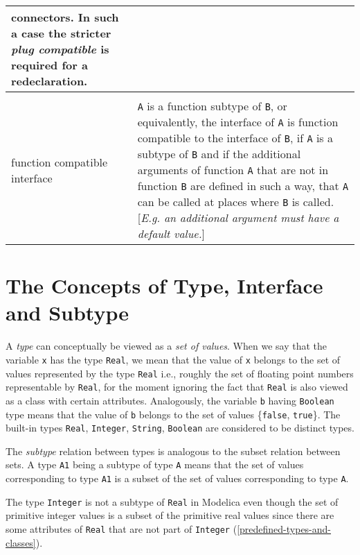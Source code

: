\begin{longtable}{|p{4cm}|p{8cm}|}
connectors. In such a case the stricter \emph{plug compatible} is required
for a redeclaration.\\ \hline
\begin{tabular}{@{}p{4cm}@{}}
function subtype or\\
function compatible interface
\end{tabular} &
\lstinline!A! is a function subtype of \lstinline!B!, or equivalently, the interface of \lstinline!A! is
function compatible to the interface of \lstinline!B!, if \lstinline!A! is a subtype of \lstinline!B! and if
the additional arguments of function \lstinline!A! that are not in function \lstinline!B! are
defined in such a way, that \lstinline!A! can be called at places where \lstinline!B! is called.
{[}\emph{E.g. an additional argument must have a default
value.}{]}\\ \hline
\end{longtable}

\section{The Concepts of Type, Interface and Subtype}

A \emph{type} can conceptually be viewed as a \emph{set of values}. When
we say that the variable \lstinline!x! has the type \lstinline!Real!, we mean that the value of
\lstinline!x! belongs to the set of values represented by the type \lstinline!Real! i.e.,
roughly the set of floating point numbers representable by \lstinline!Real!, for the
moment ignoring the fact that \lstinline!Real! is also viewed as a class with
certain attributes. Analogously, the variable \lstinline!b! having \lstinline!Boolean! type
means that the value of \lstinline!b! belongs to the set of values \{\lstinline!false!, \lstinline!true!\}.
The built-in types \lstinline!Real!, \lstinline!Integer!, \lstinline!String!,
\lstinline!Boolean! are considered to be
distinct types.

The \emph{subtype} relation between types is analogous to the subset
relation between sets. A type \lstinline!A1! being a subtype of type \lstinline!A! means that
the set of values corresponding to type \lstinline!A1! is a subset of the set of
values corresponding to type \lstinline!A!.

The type \lstinline!Integer! is not a subtype of \lstinline!Real! in Modelica even though the
set of primitive integer values is a subset of the primitive real values
since there are some attributes of \lstinline!Real! that are not part of \lstinline!Integer!
(\autoref{predefined-types-and-classes}).

